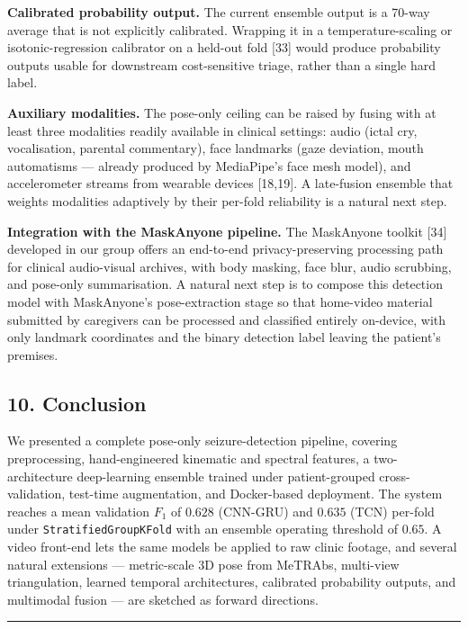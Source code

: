 \documentclass[
  11pt,
]{article}
\begin{document}
\textbf{Calibrated probability output.} The current ensemble output is a
70-way average that is not explicitly calibrated. Wrapping it in a
temperature-scaling or isotonic-regression calibrator on a held-out fold
{[}33{]} would produce probability outputs usable for downstream
cost-sensitive triage, rather than a single hard label.

\textbf{Auxiliary modalities.} The pose-only ceiling can be raised by
fusing with at least three modalities readily available in clinical
settings: audio (ictal cry, vocalisation, parental commentary), face
landmarks (gaze deviation, mouth automatisms --- already produced by
MediaPipe's face mesh model), and accelerometer streams from wearable
devices {[}18,19{]}. A late-fusion ensemble that weights modalities
adaptively by their per-fold reliability is a natural next step.

\textbf{Integration with the MaskAnyone pipeline.} The MaskAnyone
toolkit {[}34{]} developed in our group offers an end-to-end
privacy-preserving processing path for clinical audio-visual archives,
with body masking, face blur, audio scrubbing, and pose-only
summarisation. A natural next step is to compose this detection model
with MaskAnyone's pose-extraction stage so that home-video material
submitted by caregivers can be processed and classified entirely
on-device, with only landmark coordinates and the binary detection label
leaving the patient's premises.

\subsection{10. Conclusion}\label{conclusion}

We presented a complete pose-only seizure-detection pipeline, covering
preprocessing, hand-engineered kinematic and spectral features, a
two-architecture deep-learning ensemble trained under patient-grouped
cross-validation, test-time augmentation, and Docker-based deployment.
The system reaches a mean validation \(F_1\) of \(0.628\) (CNN-GRU) and
\(0.635\) (TCN) per-fold under \texttt{StratifiedGroupKFold} with an
ensemble operating threshold of \(0.65\). A video front-end lets the
same models be applied to raw clinic footage, and several natural
extensions --- metric-scale 3D pose from MeTRAbs, multi-view
triangulation, learned temporal architectures, calibrated probability
outputs, and multimodal fusion --- are sketched as forward directions.

\begin{center}\rule{0.5\linewidth}{0.5pt}\end{center}
\end{document}
